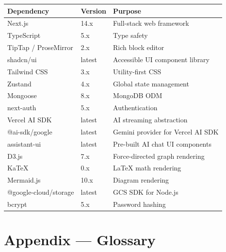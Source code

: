 \documentclass[12pt, a4paper]{article}
\begin{document}
\begin{longtable}{@{}L{4.2cm} C{2.5cm} L{6.5cm}@{}}
  \toprule
  \textbf{Dependency} & \textbf{Version} & \textbf{Purpose} \\
  \midrule\endhead
  \bottomrule\endfoot
  Next.js               & 14.x    & Full-stack web framework \\
  TypeScript            & 5.x     & Type safety \\
  TipTap / ProseMirror  & 2.x     & Rich block editor \\
  shadcn/ui             & latest  & Accessible UI component library \\
  Tailwind CSS          & 3.x     & Utility-first CSS \\
  Zustand               & 4.x     & Global state management \\
  Mongoose              & 8.x     & MongoDB ODM \\
  next-auth             & 5.x     & Authentication \\
  Vercel AI SDK         & latest  & AI streaming abstraction \\
  @ai-sdk/google        & latest  & Gemini provider for Vercel AI SDK \\
  assistant-ui          & latest  & Pre-built AI chat UI components \\
  D3.js                 & 7.x     & Force-directed graph rendering \\
  KaTeX                 & 0.x     & \LaTeX{} math rendering \\
  Mermaid.js            & 10.x    & Diagram rendering \\
  @google-cloud/storage & latest  & GCS SDK for Node.js \\
  bcrypt                & 5.x     & Password hashing \\
\end{longtable}

\section{Appendix — Glossary}
\label{sec:glossary}
\end{document}
